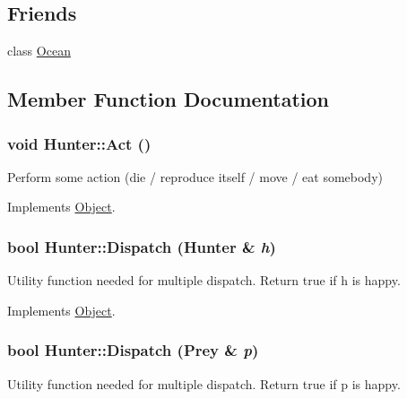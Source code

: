 \subsection*{Friends}
\begin{DoxyCompactItemize}
\item 
\hypertarget{classHunter_afe3874c2dc8ab0fb894a9f3c80bfa1ad}{
class \hyperlink{classHunter_afe3874c2dc8ab0fb894a9f3c80bfa1ad}{Ocean}}
\label{classHunter_afe3874c2dc8ab0fb894a9f3c80bfa1ad}

\end{DoxyCompactItemize}


\subsection{Member Function Documentation}
\hypertarget{classHunter_ac8bed4eeb2bfebcf7df72ba7359ac204}{
\subsubsection[{Act}]{\setlength{\rightskip}{0pt plus 5cm}void Hunter::Act ()}}
\label{classHunter_ac8bed4eeb2bfebcf7df72ba7359ac204}
Perform some action (die / reproduce itself / move / eat somebody) 

Implements \hyperlink{classObject_a683b351ee47dc69c4117cb9017c467d6}{Object}.

\hypertarget{classHunter_a3c9a7768f590ef9031b52ae58b5216a6}{
\subsubsection[{Dispatch}]{\setlength{\rightskip}{0pt plus 5cm}bool Hunter::Dispatch ({\bf Hunter} \& {\em h})}}
\label{classHunter_a3c9a7768f590ef9031b52ae58b5216a6}
Utility function needed for multiple dispatch. Return true if h is happy. 

Implements \hyperlink{classObject_a0d0e1f0456837f6736913b1ba374f11d}{Object}.

\hypertarget{classHunter_ac37d719ac6068a9b3a72650fd4034ad4}{
\subsubsection[{Dispatch}]{\setlength{\rightskip}{0pt plus 5cm}bool Hunter::Dispatch ({\bf Prey} \& {\em p})}}
\label{classHunter_ac37d719ac6068a9b3a72650fd4034ad4}
Utility function needed for multiple dispatch. Return true if p is happy. 

